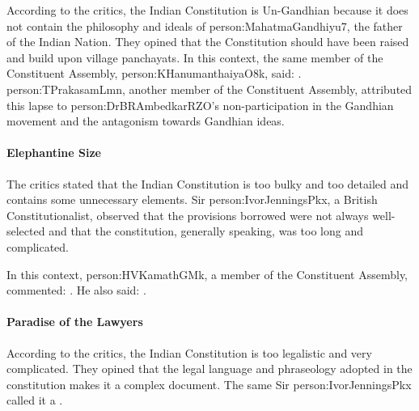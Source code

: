 According to the critics, the Indian Constitution is Un-Gandhian because it does not contain the philosophy and ideals of \gls{person:MahatmaGandhiyu7}, the father of the Indian Nation. They opined that the Constitution should have been raised and build upon village panchayats. In this context, the same member of the Constituent Assembly, \gls{person:KHanumanthaiyaO8k}, said: . \gls{person:TPrakasamLmn}, another member of the Constituent Assembly, attributed this lapse to \gls{person:DrBRAmbedkarRZO}'s non-participation in the Gandhian movement and the antagonism towards Gandhian ideas.

\paragraph{Elephantine Size}

The critics stated that the Indian Constitution is too bulky and too detailed and contains some unnecessary elements. Sir \gls{person:IvorJenningsPkx}, a British Constitutionalist, observed that the provisions borrowed were not always well-selected and that the constitution, generally speaking, was too long and complicated.

In this context, \gls{person:HVKamathGMk}, a member of the Constituent Assembly, commented: . He also said: .

\paragraph{Paradise of the Lawyers}

According to the critics, the Indian Constitution is too legalistic and very complicated. They opined that the legal language and phraseology adopted in the constitution makes it a complex document. The same Sir \gls{person:IvorJenningsPkx} called it a .

